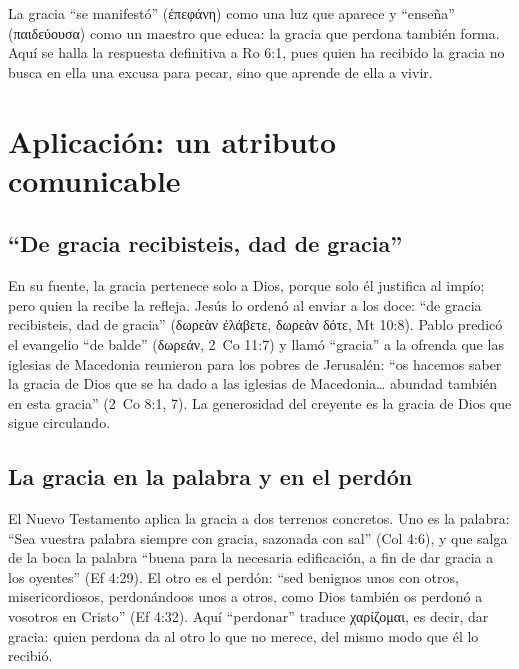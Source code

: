 \documentclass[11pt,letterpaper]{article}
\newcommand{\grc}[1]{\foreignlanguage{ancientgreek}{#1}}
\begin{document}
La gracia ``se manifestó'' (\grc{ἐπεφάνη}) como una luz que aparece y ``enseña'' (\grc{παιδεύουσα}) como un maestro que educa: la gracia que perdona también forma. Aquí se halla la respuesta definitiva a Ro 6:1, pues quien ha recibido la gracia no busca en ella una excusa para pecar, sino que aprende de ella a vivir.

\section{Aplicación: un atributo comunicable}

\subsection{``De gracia recibisteis, dad de gracia''}
En su fuente, la gracia pertenece solo a Dios, porque solo él justifica al impío; pero quien la recibe la refleja. Jesús lo ordenó al enviar a los doce: ``de gracia recibisteis, dad de gracia'' (\grc{δωρεὰν ἐλάβετε, δωρεὰν δότε}, Mt 10:8). Pablo predicó el evangelio ``de balde'' (\grc{δωρεάν}, 2~Co 11:7) y llamó ``gracia'' a la ofrenda que las iglesias de Macedonia reunieron para los pobres de Jerusalén: ``os hacemos saber la gracia de Dios que se ha dado a las iglesias de Macedonia\ldots{} abundad también en esta gracia'' (2~Co 8:1, 7). La generosidad del creyente es la gracia de Dios que sigue circulando.

\subsection{La gracia en la palabra y en el perdón}
El Nuevo Testamento aplica la gracia a dos terrenos concretos. Uno es la palabra: ``Sea vuestra palabra siempre con gracia, sazonada con sal'' (Col 4:6), y que salga de la boca la palabra ``buena para la necesaria edificación, a fin de dar gracia a los oyentes'' (Ef 4:29). El otro es el perdón: ``sed benignos unos con otros, misericordiosos, perdonándoos unos a otros, como Dios también os perdonó a vosotros en Cristo'' (Ef 4:32). Aquí ``perdonar'' traduce \grc{χαρίζομαι}, es decir, dar gracia: quien perdona da al otro lo que no merece, del mismo modo que él lo recibió.
\end{document}
